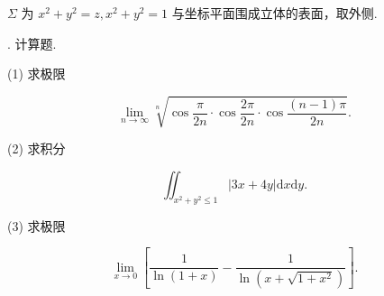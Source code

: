 \documentclass{examcollection}
\renewcommand{\displayformula}[1]{\[#1\]}
\begin{document}
{\begin{minipage}{\textwidth}
$\Sigma$ 为 $x^{2} + y^{2} = z, x^{2} + y^{2} = 1$ 与坐标平面围成立体的表面，取外侧.\par
{}. 计算题.\par
(1) 求极限\par
\displayformula{\lim _ {n \rightarrow \infty} \sqrt [ n ]{\cos \frac {\pi}{2 n} \cdot \cos \frac {2 \pi}{2 n} \cdot \cos \frac {(n - 1) \pi}{2 n}}.}\par
(2) 求积分\par
\displayformula{\iint_ {x ^ {2} + y ^ {2} \leq 1} | 3 x + 4 y | \mathrm{d} x \mathrm{d} y.}\par
(3) 求极限\par
\displayformula{\lim _ {x \rightarrow 0} \left[ \frac {1}{\ln (1 + x)} - \frac {1}{\ln (x + \sqrt {1 + x ^ {2}})} \right].}\par
\end{minipage}}
\ifdim\dimexpr\ht\proofbox+\dp\proofbox\relax>\textheight
\noindent\resizebox{!}{\textheight}{\usebox{\proofbox}}\else\noindent\usebox{\proofbox}\fi\clearpage
\end{document}

